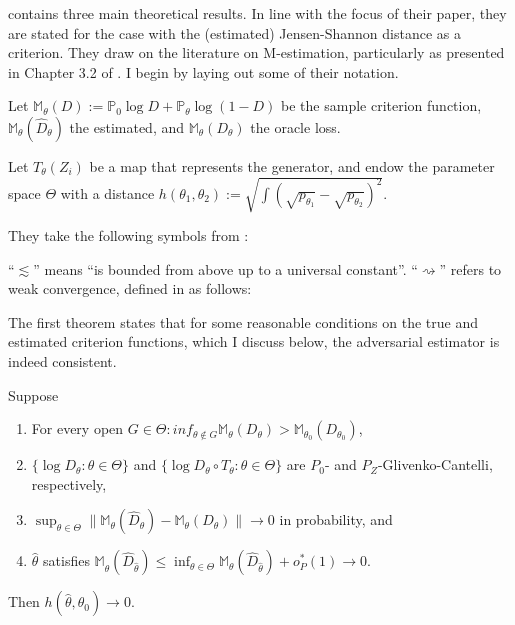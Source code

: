 \textcite{kaji2023adversarial} contains three main theoretical results.
In line with the focus of their paper, they are stated for the case with the (estimated) Jensen-Shannon distance as a criterion.
They draw on the literature on M-estimation, particularly as presented in Chapter 3.2 of \textcite{vanderVaart2023}. %
I begin by laying out some of their notation.

Let $\mathbb{M}_{\theta}(D):=\mathbb{P}_{0} \log D+\mathbb{P}_{\theta} \log (1-D)$ be the sample criterion function, 
$\mathbb{M}_{\theta}\left(\hat{D}_{\theta}\right)$ the estimated, and 
$\mathbb{M}_{\theta}\left(D_{\theta}\right)$ the oracle loss.

Let $T_{\theta}(Z_i)$ be a map that represents the generator,
and endow the parameter space $\Theta$ with a distance $h\left(\theta_{1}, \theta_{2}\right):=\sqrt{\int\left(\sqrt{p_{\theta_{1}}}-\sqrt{p_{\theta_{2}}}\right)^{2}}$.

They take the following symbols from \textcite{vanderVaart2023}:

``$\lesssim$'' means ``is bounded from above up to a universal constant''.
``$\rightsquigarrow$'' refers to weak convergence, defined in \textcite{vanderVaart2023} as follows:


The first theorem states that for some reasonable conditions on the true and estimated criterion functions, which I discuss below, the adversarial estimator is indeed consistent.

\begin{theorem}
    \label{th:kmp_1}
    Suppose
    \begin{enumerate}
        \item For every open $G \in \Theta : inf_{\theta \notin G} \mathbb{M}_{\theta}(D_{\theta}) > \mathbb{M}_{\theta_0}(D_{\theta_0})$,
        \item $\{ \log D_{\theta} : \theta \in \Theta \}$ and $\{ \log D_{\theta} \circ T_{\theta}: \theta \in \Theta \}$ are $P_0$- and $P_Z$-Glivenko-Cantelli, respectively,
        \item $\sup_{\theta \in \Theta} \| \mathbb{M}_{\theta}(\hat{D}_{\theta}) - \mathbb{M}_{\theta}(D_{\theta}) \| \rightarrow 0$ in probability, and
        \item $\hat{\theta}$ satisfies $\mathbb{M}_{\hat{\theta}}(\hat{D}_{\hat{\theta}}) \leq \inf_{\theta \in \Theta} \mathbb{M}_{\theta}(\hat{D}_{\hat{\theta}}) + o_P^{*}(1) \rightarrow 0$.
    \end{enumerate}
    Then $h(\hat{\theta}, \theta_0) \rightarrow 0$.
\end{theorem}

